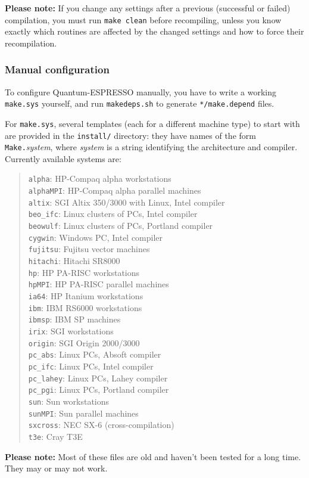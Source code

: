\documentclass[12pt,a4paper]{article}
\begin{document}
\textbf{Please note:}
If you change any settings after a previous (successful or failed)
compilation, you must run \texttt{make clean} before recompiling,
unless you know exactly which routines are affected by the changed
settings and how to force their recompilation.

\subsubsection{Manual configuration}
  \label{manualconf}

To configure Quantum-ESPRESSO manually, you have to write a working
\texttt{make.sys} yourself, and run \texttt{makedeps.sh} to generate
\texttt{*/make.depend} files.

For \texttt{make.sys}, several templates (each for a different machine
type) to start with are provided in the \texttt{install/} directory:
they have names of the form \texttt{Make.}\emph{system}, where
\emph{system} is a string identifying the architecture and compiler.
Currently available systems are:
\begin{quote}
  \texttt{alpha}:     HP-Compaq alpha workstations\\
  \texttt{alphaMPI}:  HP-Compaq alpha parallel machines\\
  \texttt{altix}:     SGI Altix 350/3000 with Linux, Intel compiler\\
  \texttt{beo\_ifc}:  Linux clusters of PCs, Intel compiler\\
  \texttt{beowulf}:   Linux clusters of PCs, Portland compiler\\
  \texttt{cygwin}:    Windows PC, Intel compiler\\
  \texttt{fujitsu}:   Fujitsu vector machines\\
  \texttt{hitachi}:   Hitachi SR8000\\
  \texttt{hp}:        HP PA-RISC workstations\\
  \texttt{hpMPI}:     HP PA-RISC parallel machines\\
  \texttt{ia64}:      HP Itanium workstations\\
  \texttt{ibm}:       IBM RS6000 workstations\\
  \texttt{ibmsp}:     IBM SP machines\\
  \texttt{irix}:      SGI workstations\\
  \texttt{origin}:    SGI Origin 2000/3000\\
  \texttt{pc\_abs}:   Linux PCs, Absoft compiler\\
  \texttt{pc\_ifc}:   Linux PCs, Intel compiler\\
  \texttt{pc\_lahey}: Linux PCs, Lahey compiler\\
  \texttt{pc\_pgi}:   Linux PCs, Portland compiler\\
  \texttt{sun}:       Sun workstations\\
  \texttt{sunMPI}:    Sun parallel machines\\
  \texttt{sxcross}:   NEC SX-6 (cross-compilation)\\
  \texttt{t3e}:       Cray T3E
\end{quote}
\textbf{Please note:}
Most of these files are old and haven't been tested for a long time.
They may or may not work.
\end{document}
